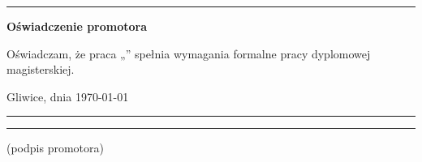 
\cleardoublepage

\rule{1cm}{0cm}

\vfill

\begin{center}
	\Large\bfseries Oświadczenie promotora
\end{center}

\vfill

Oświadczam, że praca „\tytul” spełnia wymagania formalne pracy dyplomowej magisterskiej.

\vfill



\vfill

Gliwice, dnia \today

\rule{0.5\textwidth}{0cm}\dotfill

\rule{0.5\textwidth}{0cm}
\begin{minipage}{0.45\textwidth}
	{\begin{center}(podpis promotora)\end{center}}
\end{minipage}

\vfill



\cleardoublepage